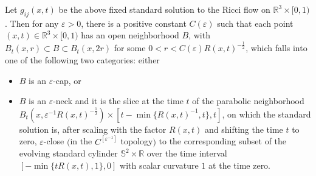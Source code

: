 \begin{lemma}
  \label{lem:cz-standard-solution-canonical-neighborhoods}

Let $g_{ij}(x,t)$ be the above fixed standard solution to the
Ricci flow on $\mathbb{R}^3\times [0,1)$.  Then for any
$\varepsilon>0$, there is a positive constant $C(\varepsilon)$
such that each point $(x,t) \in \mathbb{R}^3\times [0,1)$ has an
open neighborhood $B$, with $B_t(x,r)\subset B \subset B_t(x,2r)$
for some $0<r<C(\varepsilon)R(x,t)^{-\frac{1}{2}}$, which falls
into one of the following two categories: either
\begin{itemize}
\item[(a)] $B$ is  an $\varepsilon$-cap, or \item[(b)] $B$ is an
$\varepsilon$-neck and it is the slice at the time $t$ of the
parabolic neighborhood
$B_t(x,\varepsilon^{-1}R(x,t)^{-\frac{1}{2}}) \times [t-\min
\{R(x,t)^{-1},t\},t]$, on which the standard solution is, after
scaling with the factor $R(x,t)$ and shifting the time $t$ to
zero, $\varepsilon$-close $($in the $C^{[\varepsilon^{-1}]}$
topology$)$ to the corresponding subset of the evolving standard
cylinder $\mathbb{S}^2 \times \mathbb{R}$ over the time interval
$[-\min \{tR(x,t),1\},0]$ with scalar curvature $1$ at the time
zero.
\end{itemize}
\end{lemma}

